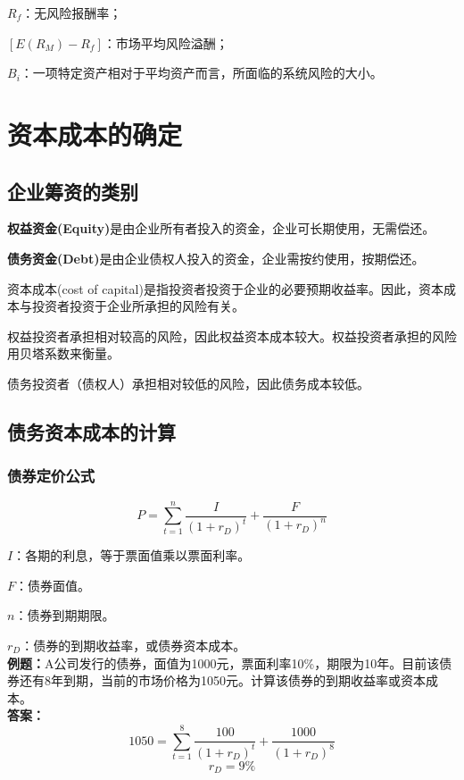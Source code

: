 \documentclass[12pt, a4paper, oneside]{ctexbook}
\begin{document}
$R_f$：无风险报酬率；

$[E(R_M)-R_f]$：市场平均风险溢酬；

$B_i$：一项特定资产相对于平均资产而言，所面临的系统风险的大小。

\section{资本成本的确定}
\subsection{企业筹资的类别}
\textbf{权益资金(Equity)}是由企业所有者投入的资金，企业可长期使用，无需偿还。

\textbf{债务资金(Debt)}是由企业债权人投入的资金，企业需按约使用，按期偿还。

资本成本(cost of capital)是指投资者投资于企业的必要预期收益率。因此，资本成本与投资者投资于企业所承担的风险有关。

权益投资者承担相对较高的风险，因此权益资本成本较大。权益投资者承担的风险用贝塔系数来衡量。

债务投资者（债权人）承担相对较低的风险，因此债务成本较低。

\subsection{债务资本成本的计算}
\subsubsection{债券定价公式}
$$P=\sum_{t=1}^{n} \frac{I}{(1+r_D)^t}+\frac{F}{(1+r_D)^n}$$

$I$：各期的利息，等于票面值乘以票面利率。

$F$：债券面值。

$n$：债券到期期限。

$r_D$：债券的到期收益率，或债券资本成本。\\
\textbf{例题：}A公司发行的债券，面值为1000元，票面利率10\%，期限为10年。目前该债券还有8年到期，当前的市场价格为1050元。计算该债券的到期收益率或资本成本。\\
\textbf{答案：}
$$1050=\sum_{t=1}^{8}\frac{100}{(1+r_D)^t}+\frac{1000}{(1+r_D)^8}$$
$$r_D=9\%$$
\end{document}
